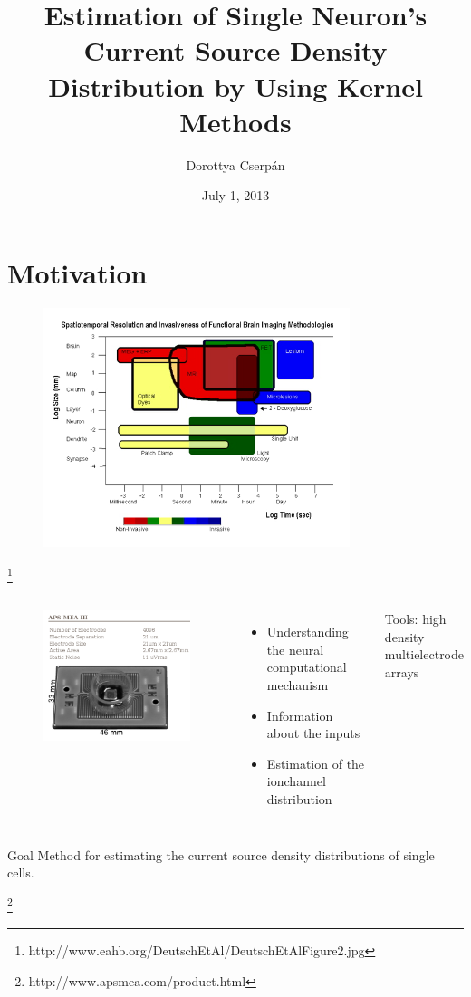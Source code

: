 \documentclass[11pt,a4paper,titlepage]{beamer}
\author{Dorottya Cserpán}
\title{Estimation of Single Neuron's
           Current Source Density Distribution
                 by Using Kernel Methods
}
\date{July 1, 2013}
\begin{document}
\begin{frame}
\titlepage
\end{frame}



\section{Motivation}
 
 \begin{frame}
 \begin{figure}
\includegraphics[height=7cm]{plots/DeutschEtAlFigure2.png}

\end{figure}
\footnote{http://www.eahb.org/DeutschEtAl/DeutschEtAlFigure2.jpg}
 \end{frame}
 \begin{frame}
\begin{columns}


\begin{figure}
\includegraphics[height=5 cm]{plots/aps_mea.png}
\end{figure}

\begin{itemize}
\item Understanding the neural computational mechanism 
\item Information about the inputs
\item Estimation of the ionchannel distribution
\end{itemize} 

Tools:
high density multielectrode arrays
\end{columns}
\begin{block}{Goal}
Method for estimating the current source density distributions of single cells.
\end{block}
\footnote{http://www.apsmea.com/product.html}
\end{frame}
\end{document}
